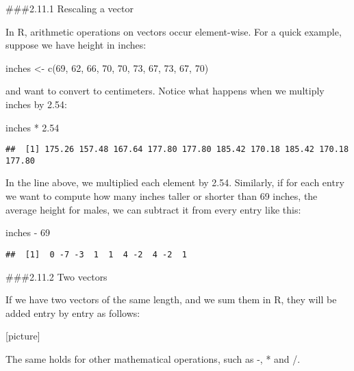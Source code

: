 \documentclass[
]{article}
\newenvironment{Shaded}{\begin{snugshade}}{\end{snugshade}}
\newcommand{\DecValTok}[1]{\textcolor[rgb]{0.00,0.00,0.81}{#1}}
\newcommand{\FloatTok}[1]{\textcolor[rgb]{0.00,0.00,0.81}{#1}}
\newcommand{\FunctionTok}[1]{\textcolor[rgb]{0.00,0.00,0.00}{#1}}
\newcommand{\NormalTok}[1]{#1}
\newcommand{\OtherTok}[1]{\textcolor[rgb]{0.56,0.35,0.01}{#1}}
\newcommand{\SpecialCharTok}[1]{\textcolor[rgb]{0.00,0.00,0.00}{#1}}
\begin{document}
\#\#\#2.11.1 Rescaling a vector

In R, arithmetic operations on vectors occur element-wise. For a quick
example, suppose we have height in inches:

\begin{Shaded}
\begin{Highlighting}[]
\NormalTok{inches }\OtherTok{\textless{}{-}} \FunctionTok{c}\NormalTok{(}\DecValTok{69}\NormalTok{, }\DecValTok{62}\NormalTok{, }\DecValTok{66}\NormalTok{, }\DecValTok{70}\NormalTok{, }\DecValTok{70}\NormalTok{, }\DecValTok{73}\NormalTok{, }\DecValTok{67}\NormalTok{, }\DecValTok{73}\NormalTok{, }\DecValTok{67}\NormalTok{, }\DecValTok{70}\NormalTok{)}
\end{Highlighting}
\end{Shaded}

and want to convert to centimeters. Notice what happens when we multiply
inches by 2.54:

\begin{Shaded}
\begin{Highlighting}[]
\NormalTok{inches }\SpecialCharTok{*} \FloatTok{2.54}
\end{Highlighting}
\end{Shaded}

\begin{verbatim}
##  [1] 175.26 157.48 167.64 177.80 177.80 185.42 170.18 185.42 170.18 177.80
\end{verbatim}

In the line above, we multiplied each element by 2.54. Similarly, if for
each entry we want to compute how many inches taller or shorter than 69
inches, the average height for males, we can subtract it from every
entry like this:

\begin{Shaded}
\begin{Highlighting}[]
\NormalTok{inches }\SpecialCharTok{{-}} \DecValTok{69}
\end{Highlighting}
\end{Shaded}

\begin{verbatim}
##  [1]  0 -7 -3  1  1  4 -2  4 -2  1
\end{verbatim}

\#\#\#2.11.2 Two vectors

If we have two vectors of the same length, and we sum them in R, they
will be added entry by entry as follows:

{[}picture{]}

The same holds for other mathematical operations, such as -, * and /.
\end{document}
